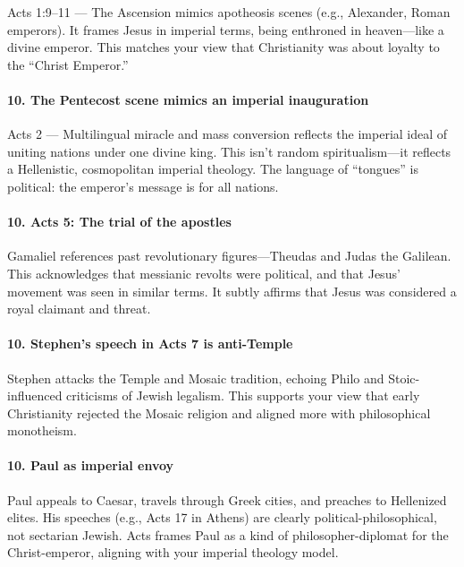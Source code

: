 Acts 1:9--11 --- The Ascension mimics apotheosis scenes (e.g., Alexander, Roman emperors).
It frames Jesus in imperial terms, being enthroned in heaven---like a divine emperor.
This matches your view that Christianity was about loyalty to the ``Christ Emperor.''

\paragraph{10.
The Pentecost scene mimics an imperial inauguration}\label{par:the-pentecost-scene-mimics-an-imperial-inauguration}

Acts 2 --- Multilingual miracle and mass conversion reflects the imperial ideal of uniting nations under one divine king.
This isn't random spiritualism---it reflects a Hellenistic, cosmopolitan imperial theology.
The language of ``tongues'' is political: the emperor's message is for all nations.

\paragraph{10.
Acts 5: The trial of the apostles}\label{par:acts-5-the-trial-of-the-apostles}

Gamaliel references past revolutionary figures---Theudas and Judas the Galilean.
This acknowledges that messianic revolts were political, and that Jesus' movement was seen in similar terms.
It subtly affirms that Jesus was considered a royal claimant and threat.

\paragraph{10.
Stephen's speech in Acts 7 is anti-Temple}\label{par:stephens-speech-in-acts-7-is-anti-temple}

Stephen attacks the Temple and Mosaic tradition, echoing Philo and Stoic-influenced criticisms of Jewish legalism.
This supports your view that early Christianity rejected the Mosaic religion and aligned more with philosophical monotheism.

\paragraph{10.
Paul as imperial envoy}\label{par:paul-as-imperial-envoy}

Paul appeals to Caesar, travels through Greek cities, and preaches to Hellenized elites.
His speeches (e.g., Acts 17 in Athens) are clearly political-philosophical, not sectarian Jewish.
Acts frames Paul as a kind of philosopher-diplomat for the Christ-emperor, aligning with your imperial theology model.

